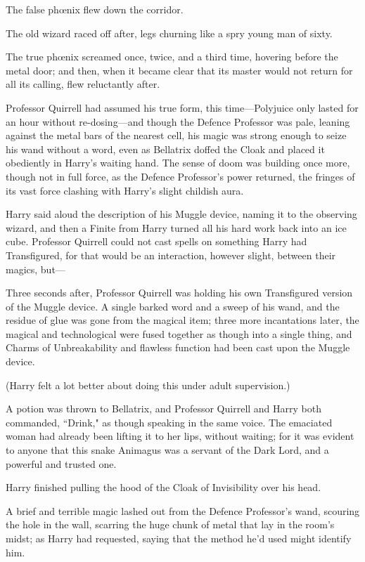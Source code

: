 The false phœnix flew down the corridor.

The old wizard raced off after, legs churning like a spry young man of sixty.

The true phœnix screamed once, twice, and a third time, hovering before the metal door; and then, when it became clear that its master would not return for all its calling, flew reluctantly after.

\later

Professor Quirrell had assumed his true form, this time—Polyjuice only lasted for an hour without re-dosing—and though the Defence Professor was pale, leaning against the metal bars of the nearest cell, his magic was strong enough to seize his wand without a word, even as Bellatrix doffed the Cloak and placed it obediently in Harry's waiting hand. The sense of doom was building once more, though not in full force, as the Defence Professor's power returned, the fringes of its vast force clashing with Harry's slight childish aura.

Harry said aloud the description of his Muggle device, naming it to the observing wizard, and then a Finite from Harry turned all his hard work back into an ice cube. Professor Quirrell could not cast spells on something Harry had Transfigured, for that would be an interaction, however slight, between their magics, but—

Three seconds after, Professor Quirrell was holding his own Transfigured version of the Muggle device. A single barked word and a sweep of his wand, and the residue of glue was gone from the magical item; three more incantations later, the magical and technological were fused together as though into a single thing, and Charms of Unbreakability and flawless function had been cast upon the Muggle device.

(Harry felt a lot better about doing this under adult supervision.)

A potion was thrown to Bellatrix, and Professor Quirrell and Harry both commanded, ``Drink," as though speaking in the same voice. The emaciated woman had already been lifting it to her lips, without waiting; for it was evident to anyone that this snake Animagus was a servant of the Dark Lord, and a powerful and trusted one.

Harry finished pulling the hood of the Cloak of Invisibility over his head.

A brief and terrible magic lashed out from the Defence Professor's wand, scouring the hole in the wall, scarring the huge chunk of metal that lay in the room's midst; as Harry had requested, saying that the method he'd used might identify him.

